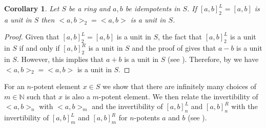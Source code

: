 \documentclass[12pt]{amsart}
\newtheorem{cor}[theorem]{Corollary}
\theoremstyle{definition}
\numberwithin{equation}{section}
\begin{document}
\begin{cor}\cite[Theorem~2.13 (3)]{khurana2018idempotents} \label{COR: Corollary for anticommutator vs commutator for n=2}
Let $S$ be a ring and $a,b$ be idempotents in $S$. If $[a,b]_2^L=[a,b]$ is a unit in $S$ then $<a,b>_2=<a,b>$ is a unit in $S$. 
\end{cor}
\begin{proof}
  Given that $[a,b]_2^L=[a,b]$ is a unit in $S$, the fact that  $[a,b]_2^L$ is a unit in $S$ if and only if $[a,b]_2^R$ is a unit in $S$ and the proof of  gives that $a-b$ is a unit in $S$. However, this implies that $a+b$ is a unit in $S$ (see \cite[Theorem~2.8]{khurana2018idempotents}). Therefore, by  we have $<a,b>_2=<a,b>$ is a unit in $S$. 
\end{proof}


For an $n$-potent element $x \in S$ we show that there are infinitely many choices of $m \in \mathbb{N}$ such that $x$ is also a $m$-potent element. We then relate the invertibility of $<a,b>_n$ with $<a,b>_m$ and the invertibility of $[a,b]_n^L$ and $[a,b]_n^R$ with the invertibility of $[a,b]_m^L$ and $[a,b]_m^R$ for $n$-potents $a$ and $b$ (see ). 
\end{document}
